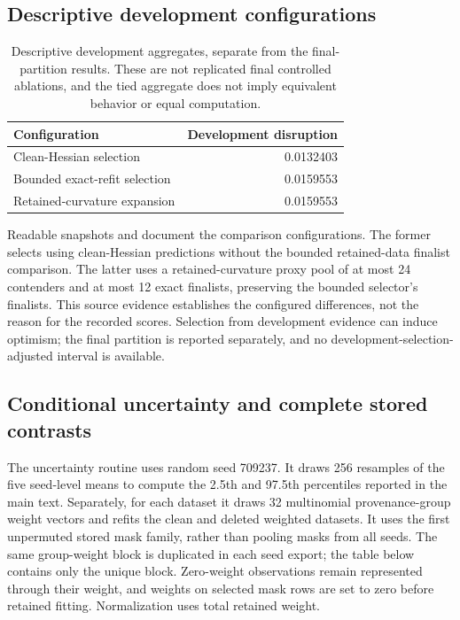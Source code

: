 \documentclass{article}
\begin{document}
\subsection{Descriptive development configurations}
\begin{table}[h]
 \centering
 \begin{tabular}{lr}
 \toprule
 Configuration & Development disruption \\
 \midrule
 Clean-Hessian selection & 0.0132403 \\
 Bounded exact-refit selection & 0.0159553 \\
 Retained-curvature expansion & 0.0159553 \\
 \bottomrule
 \end{tabular}
 \caption{Descriptive development aggregates, separate from the final-partition results. These are not replicated final controlled ablations, and the tied aggregate does not imply equivalent behavior or equal computation.}
 \label{tab:development}
\end{table}
Readable snapshots  and  document the comparison configurations. The former selects using clean-Hessian predictions without the bounded retained-data finalist comparison. The latter uses a retained-curvature proxy pool of at most 24 contenders and at most 12 exact finalists, preserving the bounded selector's finalists. This source evidence establishes the configured differences, not the reason for the recorded scores. Selection from development evidence can induce optimism; the final partition is reported separately, and no development-selection-adjusted interval is available.

\subsection{Conditional uncertainty and complete stored contrasts}
The uncertainty routine uses random seed 709237. It draws 256 resamples of the five seed-level means to compute the 2.5th and 97.5th percentiles reported in the main text. Separately, for each dataset it draws 32 multinomial provenance-group weight vectors and refits the clean and deleted weighted datasets. It uses the first unpermuted stored mask family, rather than pooling masks from all seeds. The same group-weight block is duplicated in each seed export; the table below contains only the unique block. Zero-weight observations remain represented through their weight, and weights on selected mask rows are set to zero before retained fitting. Normalization uses total retained weight.
\end{document}
